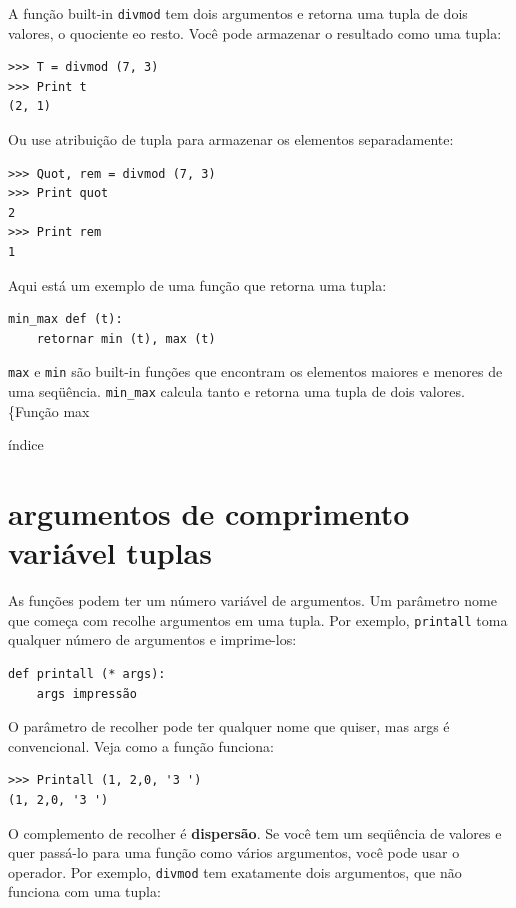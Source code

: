 \documentclass[10pt]{book}
\begin{document}
\begin{v erbatim}
{A função built-in {\tt divmod} tem dois argumentos e
retorna uma tupla de dois valores, o quociente eo resto.
Você pode armazenar o resultado como uma tupla:

\begin{verbatim}
>>> T = divmod (7, 3)
>>> Print t
(2, 1)
\end{verbatim}
%
Ou use atribuição de tupla para armazenar os elementos separadamente:

\begin{verbatim}
>>> Quot, rem = divmod (7, 3)
>>> Print quot
2
>>> Print rem
1
\end{verbatim}
%
Aqui está um exemplo de uma função que retorna uma tupla:

\begin{verbatim}
min_max def (t):
    retornar min (t), max (t)
\end{verbatim}
%
{\tt max} e {\tt min} são built-in funções que encontram
os elementos maiores e menores de uma seqüência. \Verb "min_max"
calcula tanto e retorna uma tupla de dois valores.
\{Função max} índice


\section{argumentos de comprimento variável tuplas}

As funções podem ter um número variável de argumentos. Um parâmetro
nome que começa com {\tt *} {recolhe \bf} argumentos em
uma tupla. Por exemplo, {\tt printall}
toma qualquer número de argumentos e imprime-los:

\begin{verbatim}
def printall (* args):
    args impressão
\end{verbatim}
%
O parâmetro de recolher pode ter qualquer nome que quiser, mas {args \tt} é
convencional. Veja como a função funciona:

\begin{verbatim}
>>> Printall (1, 2,0, '3 ')
(1, 2,0, '3 ')
\end{verbatim}
%
O complemento de recolher é {\bf dispersão}. Se você tem um
seqüência de valores e quer passá-lo para uma função
como vários argumentos, você pode usar o {\tt *} operador.
Por exemplo, {\tt divmod} tem exatamente dois argumentos, que
não funciona com uma tupla:


\end{v erbatim}
\end{document}
